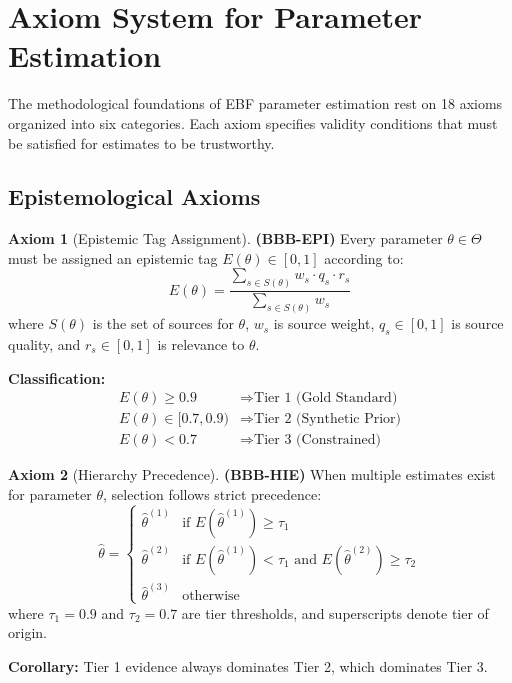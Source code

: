 \documentclass[11pt,a4paper]{article}
\theoremstyle{definition}
\newtheorem{axiom}{Axiom}[section]
\begin{document}
\section{Axiom System for Parameter Estimation}
\label{sec:bbb-axiom-system}

The methodological foundations of EBF parameter estimation rest on 
18 axioms organized into six categories. Each axiom specifies validity 
conditions that must be satisfied for estimates to be trustworthy.

\subsection{Epistemological Axioms}

\begin{axiom}[Epistemic Tag Assignment]
\label{ax:bbb-epi}
\textbf{(BBB-EPI)} Every parameter $\theta \in \Theta$ must be assigned an 
epistemic tag $E(\theta) \in [0,1]$ according to:
\begin{equation}
E(\theta) = \frac{\sum_{s \in S(\theta)} w_s \cdot q_s \cdot r_s}{\sum_{s \in S(\theta)} w_s}
\end{equation}
where $S(\theta)$ is the set of sources for $\theta$, $w_s$ is source weight, 
$q_s \in [0,1]$ is source quality, and $r_s \in [0,1]$ is relevance to $\theta$.

\textbf{Classification:}
\begin{align}
E(\theta) \geq 0.9 &\Rightarrow \text{Tier 1 (Gold Standard)} \\
E(\theta) \in [0.7, 0.9) &\Rightarrow \text{Tier 2 (Synthetic Prior)} \\
E(\theta) < 0.7 &\Rightarrow \text{Tier 3 (Constrained)}
\end{align}
\end{axiom}

\begin{axiom}[Hierarchy Precedence]
\label{ax:bbb-hie}
\textbf{(BBB-HIE)} When multiple estimates exist for parameter $\theta$, 
selection follows strict precedence:
\begin{equation}
\hat{\theta} = \begin{cases}
\hat{\theta}^{(1)} & \text{if } E(\hat{\theta}^{(1)}) \geq \tau_1 \\
\hat{\theta}^{(2)} & \text{if } E(\hat{\theta}^{(1)}) < \tau_1 \text{ and } E(\hat{\theta}^{(2)}) \geq \tau_2 \\
\hat{\theta}^{(3)} & \text{otherwise}
\end{cases}
\end{equation}
where $\tau_1 = 0.9$ and $\tau_2 = 0.7$ are tier thresholds, and superscripts 
denote tier of origin.

\textbf{Corollary:} Tier 1 evidence always dominates Tier 2, which dominates Tier 3.
\end{axiom}
\end{document}
